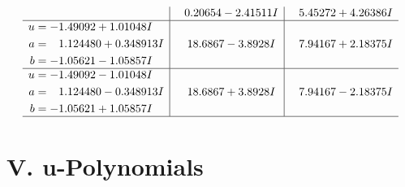 \documentclass[1p]{elsarticle_modified}
\theoremstyle{definition}
\begin{document}
$$\begin{array}{c|c|c}
 & \phantom{-}0.20654 - 2.41511 I & \phantom{-}5.45272 + 4.26386 I \\ \hline\begin{aligned}
u &= -1.49092 + 1.01048 I \\
a &= \phantom{-}1.124480 + 0.348913 I \\
b &= -1.05621 - 1.05857 I\end{aligned}
 & \phantom{-}18.6867 - 3.8928 I & \phantom{-}7.94167 + 2.18375 I \\ \hline\begin{aligned}
u &= -1.49092 - 1.01048 I \\
a &= \phantom{-}1.124480 - 0.348913 I \\
b &= -1.05621 + 1.05857 I\end{aligned}
 & \phantom{-}18.6867 + 3.8928 I & \phantom{-}7.94167 - 2.18375 I\\
 \hline 
 \end{array}$$\newpage
\newpage\renewcommand{\arraystretch}{1}
\centering \section*{ V. u-Polynomials}
\end{document}
